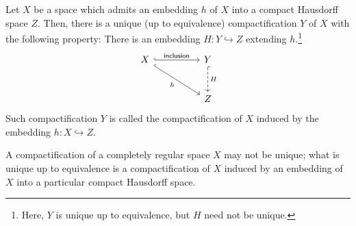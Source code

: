 \begin{thm}\label{emb&cptf}
    Let $X$ be a space which admits an embedding $h$ of $X$ into a compact Hausdorff space $Z$.
    Then, there is a unique (up to equivalence) compactification $Y$ of $X$ with the following property:
    There is an embedding $H: Y\hookrightarrow Z$ extending $h$.\footnote{Here, $Y$ is unique up to equivalence, but $H$ need not be unique.}
    \begin{equation*}
        \begin{tikzcd}[row sep=large, column sep=huge]
            X \arrow[dr, "h"', hook] \arrow[r, "\textsf{inclusion}", hook] & Y \arrow[d, "H", hook, dashed] \\
            &Z
        \end{tikzcd}
    \end{equation*}
    Such compactification $Y$ is called the compactification of $X$ induced by the embedding $h: X\hookrightarrow Z$.
\end{thm}
\begin{rmk}
    A compactification of a completely regular space $X$ may not be unique; what is unique up to equivalence is a compactification of $X$ induced by an embedding of $X$ into a particular compact Hausdorff space.
\end{rmk}
